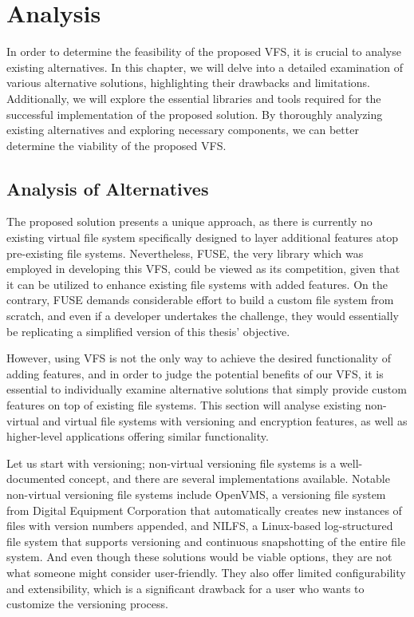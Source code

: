 \chapter{Analysis}
\label{chap:analysis}

In order to determine the feasibility of the proposed VFS, it is crucial to analyse existing alternatives.
In this chapter, we will delve into a detailed examination of various alternative solutions, highlighting their drawbacks and limitations.
Additionally, we will explore the essential libraries and tools required for the successful implementation of the proposed solution.
By thoroughly analyzing existing alternatives and exploring necessary components, we can better determine the viability of the proposed VFS\@.


\section{Analysis of Alternatives}\label{sec:alternatives}

The proposed solution presents a unique approach, as there is currently no existing virtual file system specifically designed to layer additional features atop pre-existing file systems.
Nevertheless, FUSE, the very library which was employed in developing this VFS, could be viewed as its competition, given that it can be utilized to enhance existing file systems with added features.
On the contrary, FUSE demands considerable effort to build a custom file system from scratch, and even if a developer undertakes the challenge, they would essentially be replicating a simplified version of this thesis' objective.

However, using VFS is not the only way to achieve the desired functionality of adding features, and in order to judge the potential benefits of our VFS, it is essential to individually examine alternative solutions that simply provide custom features on top of existing file systems.
This section will analyse existing non-virtual and virtual file systems with versioning and encryption features, as well as higher-level applications offering similar functionality.

Let us start with versioning; non-virtual versioning file systems is a well-documented concept, and there are several implementations available.
Notable non-virtual versioning file systems include OpenVMS, a versioning file system from Digital Equipment Corporation that automatically creates new instances of files with version numbers appended, and NILFS, a Linux-based log-structured file system that supports versioning and continuous snapshotting of the entire file system.
And even though these solutions would be viable options, they are not what someone might consider user-friendly.
They also offer limited configurability and extensibility, which is a significant drawback for a user who wants to customize the versioning process.

